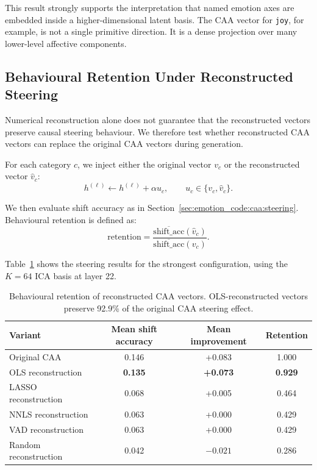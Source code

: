 \documentclass[12pt,twoside]{report}
\begin{document}
This result strongly supports the interpretation that named emotion axes are embedded inside a higher-dimensional latent basis. The CAA vector for \texttt{joy}, for example, is not a single primitive direction. It is a dense projection over many lower-level affective components.

\subsection{Behavioural Retention Under Reconstructed Steering}
\label{sec:emotion_code:caa_basis_decomposition:steering}

Numerical reconstruction alone does not guarantee that the reconstructed vectors preserve causal steering behaviour. We therefore test whether reconstructed CAA vectors can replace the original CAA vectors during generation.

For each category $c$, we inject either the original vector $v_c$ or the reconstructed vector $\hat v_c$:
\begin{equation}
h^{(\ell)}
\leftarrow
h^{(\ell)} + \alpha u_c,
\qquad
u_c \in \{v_c,\hat v_c\}.
\end{equation}

We then evaluate shift accuracy as in Section~\ref{sec:emotion_code:caa:steering}. Behavioural retention is defined as:
\begin{equation}
\mathrm{retention}
=
\frac{
\overline{\mathrm{shift\_acc}}(\hat v_c)
}{
\overline{\mathrm{shift\_acc}}(v_c)
}.
\end{equation}

Table~\ref{tab:caa-basis-retention} shows the steering results for the strongest configuration, using the $K=64$ ICA basis at layer 22.

\begin{table}[H]
\centering
\begin{tabular}{lccc}
\toprule
Variant & Mean shift accuracy & Mean improvement & Retention \\
\midrule
Original CAA & 0.146 & +0.083 & 1.000 \\
OLS reconstruction & \textbf{0.135} & \textbf{+0.073} & \textbf{0.929} \\
LASSO reconstruction & 0.068 & +0.005 & 0.464 \\
NNLS reconstruction & 0.063 & +0.000 & 0.429 \\
VAD reconstruction & 0.063 & +0.000 & 0.429 \\
Random reconstruction & 0.042 & $-0.021$ & 0.286 \\
\bottomrule
\end{tabular}
\caption{Behavioural retention of reconstructed CAA vectors. OLS-reconstructed vectors preserve 92.9\% of the original CAA steering effect.}
\label{tab:caa-basis-retention}
\end{table}
\end{document}
